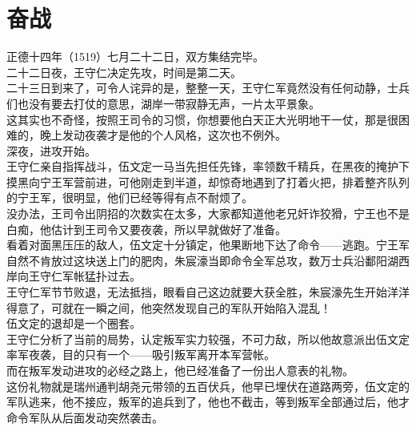 \section{奋战}
\ifnum{}
	\begin{multicols}{\theparacolNo}
\fi
正德十四年（1519）七月二十二日，双方集结完毕。\\

二十二日夜，王守仁决定先攻，时间是第二天。\\

二十三日到来了，可令人诧异的是，整整一天，王守仁军竟然没有任何动静，士兵们也没有要去打仗的意思，湖岸一带寂静无声，一片太平景象。\\

这其实也不奇怪，按照王司令的习惯，你想要他白天正大光明地干一仗，那是很困难的，晚上发动夜袭才是他的个人风格，这次也不例外。\\

深夜，进攻开始。\\

王守仁亲自指挥战斗，伍文定一马当先担任先锋，率领数千精兵，在黑夜的掩护下摸黑向宁王军营前进，可他刚走到半道，却惊奇地遇到了打着火把，排着整齐队列的宁王军，很明显，他们已经等得有点不耐烦了。\\

没办法，王司令出阴招的次数实在太多，大家都知道他老兄奸诈狡猾，宁王也不是白痴，他估计到王司令又要夜袭，所以早就做好了准备。\\

看着对面黑压压的敌人，伍文定十分镇定，他果断地下达了命令——逃跑。宁王军自然不肯放过这块送上门的肥肉，朱宸濠当即命令全军总攻，数万士兵沿鄱阳湖西岸向王守仁军帐猛扑过去。\\

王守仁军节节败退，无法抵挡，眼看自己这边就要大获全胜，朱宸濠先生开始洋洋得意了，可就在一瞬之间，他突然发现自己的军队开始陷入混乱！\\

伍文定的退却是一个圈套。\\

王守仁分析了当前的局势，认定叛军实力较强，不可力敌，所以他故意派出伍文定率军夜袭，目的只有一个——吸引叛军离开本军营帐。\\

而在叛军发动进攻的必经之路上，他已经准备了一份出人意表的礼物。\\

这份礼物就是瑞州通判胡尧元带领的五百伏兵，他早已埋伏在道路两旁，伍文定的军队逃来，他不接应，叛军的追兵到了，他也不截击，等到叛军全部通过后，他才命令军队从后面发动突然袭击。\\


\end{multicols}

